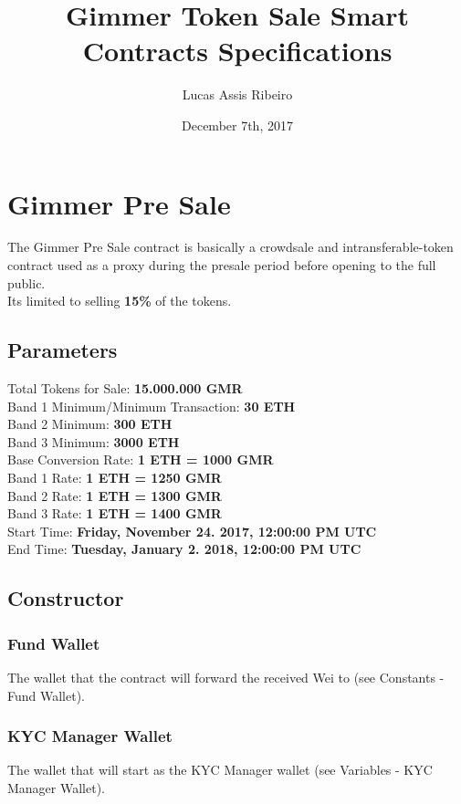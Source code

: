 \documentclass[11pt]{article} %
\title{Gimmer Token Sale Smart Contracts Specifications}
\author{Lucas Assis Ribeiro}
\date{December 7th, 2017} %
\begin{document}
\maketitle

\section {Gimmer Pre Sale}

The Gimmer Pre Sale contract is basically a crowdsale and intransferable-token contract used as a proxy during the presale period before opening to the full public.\\
Its limited to selling \textbf{15\%} of the tokens.

\subsection{Parameters}
Total Tokens for Sale: \textbf{15.000.000 GMR}\\
Band 1 Minimum/Minimum Transaction: \textbf{30 ETH}\\
Band 2 Minimum: \textbf{300 ETH}\\
Band 3 Minimum: \textbf{3000 ETH}\\
Base Conversion Rate: \textbf{1 ETH = 1000 GMR}\\
Band 1 Rate: \textbf{1 ETH = 1250 GMR}\\
Band 2 Rate: \textbf{1 ETH = 1300 GMR}\\
Band 3 Rate: \textbf{1 ETH = 1400 GMR}\\
Start Time: \textbf{Friday, November 24. 2017, 12:00:00 PM UTC}\\
End Time: \textbf{Tuesday, January 2. 2018, 12:00:00 PM UTC}\\

\subsection{Constructor}
\subsubsection{Fund Wallet}
The wallet that the contract will forward the received Wei to (see Constants - Fund Wallet).

\subsubsection{KYC Manager Wallet}
The wallet that will start as the KYC Manager wallet (see Variables - KYC Manager Wallet).
\end{document}
